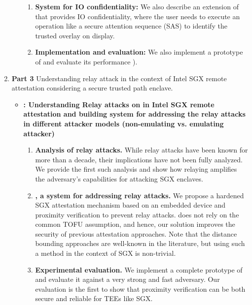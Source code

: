 \begin{enumerate}[leftmargin=*]
\begin{itemize}
\begin{enumerate}
        \item \textbf{System for IO confidentiality:} We also describe an extension of \protection that provides IO confidentiality, where the user needs to execute an operation like a secure attention sequence (SAS) to identify the trusted overlay on display.
        
        \item \textbf{Implementation and evaluation:} We also implement a prototype of \protection and evaluate its performance ).
    \end{enumerate}

\end{itemize}
   
   
\item[] \textbf{Part 3} Understanding relay attack in the context of Intel SGX remote attestation considering a secure trusted path enclave.

\begin{itemize}
    \item \textbf{\proximitee: Understanding Relay attacks on in Intel SGX remote attestation and building system for addressing the relay attacks in different attacker models (non-emulating vs. emulating attacker)}
    
    \begin{enumerate}
        \item \textbf{Analysis of relay attacks.} While relay attacks have been known for more than a decade, their implications have not been fully analyzed. We provide the first such analysis and show how relaying amplifies the adversary's capabilities for attacking SGX enclaves.   

        \item \textbf{\proximitee, a system for addressing relay attacks.} We propose a hardened SGX attestation mechanism based on an embedded device and proximity verification to prevent relay attacks. \proximitee does not rely on the common TOFU assumption, and hence, our solution improves the security of previous attestation approaches. Note that the distance bounding approaches are well-known in the literature, but using such a method in the context of SGX is non-trivial.
    
        \item \textbf{Experimental evaluation.} We implement a complete prototype of \proximitee and evaluate it against a very strong and fast adversary. Our evaluation is the first to show that proximity verification can be both secure and reliable for TEEs like SGX.
    

\end{enumerate}
\end{itemize}
\end{enumerate}
